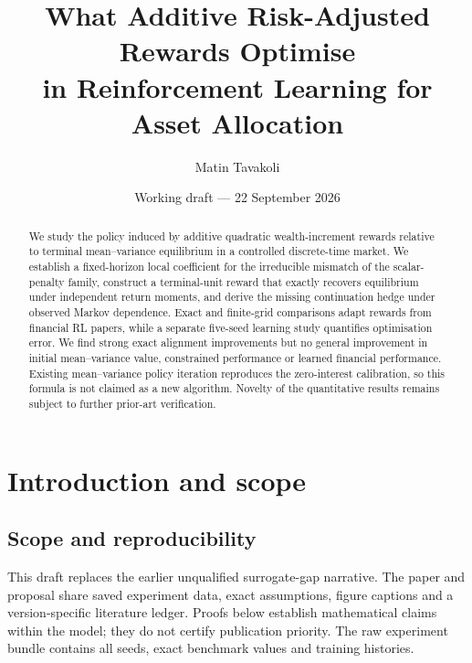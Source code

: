 \documentclass[11pt,a4paper]{article}
\title{\vspace{-2em}What Additive Risk-Adjusted Rewards Optimise\\
in Reinforcement Learning for Asset Allocation}
\author{Matin Tavakoli}
\date{Working draft --- 22 September 2026}
\theoremstyle{plain}
\theoremstyle{definition}
\theoremstyle{remark}
\begin{document}
\maketitle
\vspace{-1em}


\begin{abstract}

\noindent We study the policy induced by additive quadratic wealth-increment rewards relative to terminal mean--variance equilibrium in a controlled discrete-time market. We establish a fixed-horizon local coefficient for the irreducible mismatch of the scalar-penalty family, construct a terminal-unit reward that exactly recovers equilibrium under independent return moments, and derive the missing continuation hedge under observed Markov dependence. Exact and finite-grid comparisons adapt rewards from financial RL papers, while a separate five-seed learning study quantifies optimisation error. We find strong exact alignment improvements but no general improvement in initial mean--variance value, constrained performance or learned financial performance. Existing mean--variance policy iteration reproduces the zero-interest calibration, so this formula is not claimed as a new algorithm. Novelty of the quantitative results remains subject to further prior-art verification.

\end{abstract}

\begin{center}
\end{center}

\section{Introduction and scope}

\subsection{Scope and reproducibility}
This draft replaces the earlier unqualified surrogate-gap narrative. The paper and proposal share saved experiment data, exact assumptions, figure captions and a version-specific literature ledger. Proofs below establish mathematical claims within the model; they do not certify publication priority. The raw experiment bundle contains all seeds, exact benchmark values and training histories.
\end{document}

